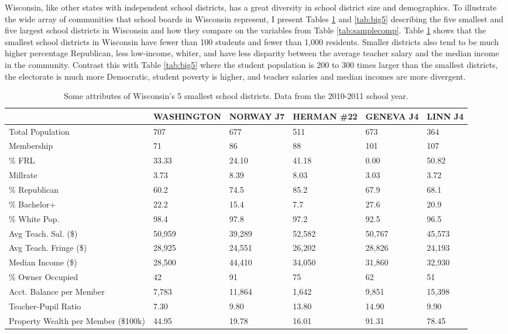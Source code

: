 Wisconsin, like other states with independent school districts, has a great diversity 
in school district size and demographics. To illustrate the wide 
array of communities that school boards in Wisconsin represent, I present Tables 
\ref{tab:small5} and \ref{tab:big5} describing the five smallest and five largest 
school districts in Wisconsin and how 
they compare on the variables from Table \ref{tab:samplecomp}. Table \ref{tab:small5} 
shows that the smallest 
school districts in Wisconsin have fewer than 100 students and fewer than 1,000 
residents. Smaller districts also tend to be much higher percentage Republican, 
less low-income, whiter, and have less disparity between the average teacher 
salary and the median income in the community. Contrast this with Table \ref{tab:big5} 
where the student population is 200 to 300 times larger than the smallest districts, 
the electorate is much more Democratic, student poverty is higher, and teacher 
salaries and median incomes are more divergent. 

\begin{table}[ht]
\centering
{\scriptsize
\begin{tabular}{p{1.25in}p{.8in}p{.8in}p{.8in}p{.8in}p{.8in}}
  \hline
 & WASHINGTON & NORWAY J7 & HERMAN \#22 & GENEVA J4 & LINN J4 \\ 
  \hline
Total Population & 707 & 677 & 511 & 673 & 364 \\ 
  Membership & 71 & 86 & 88 & 101 & 107 \\ 
  \% FRL & 33.33 & 24.10 & 41.18 & 0.00 & 50.82 \\ 
  Millrate & 3.73 & 8.39 & 8.03 & 3.03 & 3.72 \\ 
  \% Republican & 60.2 & 74.5 & 85.2 & 67.9 & 68.1 \\ 
  \% Bachelor+ & 22.2 & 15.4 & 7.7 & 27.6 & 20.9 \\ 
  \% White Pop. & 98.4 & 97.8 & 97.2 & 92.5 & 96.5 \\ 
  Avg Teach. Sal. (\$) & 50,959 & 39,289 & 52,582 & 50,767 & 45,573 \\ 
  Avg Teach. Fringe (\$) & 28,925 & 24,551 & 26,202 & 28,826 & 24,193 \\ 
  Median Income (\$) & 28,500 & 44,410 & 34,050 & 31,860 & 32,930 \\ 
  \% Owner Occupied & 42 & 91 & 75 & 62 & 51 \\ 
  Acct. Balance per Member & 7,783 & 11,864 & 1,642 & 9,851 & 15,398 \\ 
  Teacher-Pupil Ratio & 7.30 & 9.80 & 13.80 & 14.90 & 9.90 \\ 
  Property Wealth per Member (\$100k) & 44.95 & 19.78 & 16.01 & 91.31 & 78.45 \\ 
   \hline
\end{tabular}
}
\caption{Some attributes of Wisconsin's 5 smallest school districts. Data 
             from the 2010-2011 school year.} 
\label{tab:small5}
\end{table}


